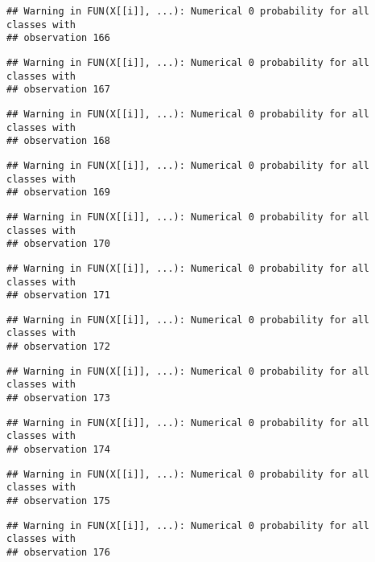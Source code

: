 \documentclass[
]{article}
\begin{document}
\begin{verbatim}
## Warning in FUN(X[[i]], ...): Numerical 0 probability for all classes with
## observation 166
\end{verbatim}

\begin{verbatim}
## Warning in FUN(X[[i]], ...): Numerical 0 probability for all classes with
## observation 167
\end{verbatim}

\begin{verbatim}
## Warning in FUN(X[[i]], ...): Numerical 0 probability for all classes with
## observation 168
\end{verbatim}

\begin{verbatim}
## Warning in FUN(X[[i]], ...): Numerical 0 probability for all classes with
## observation 169
\end{verbatim}

\begin{verbatim}
## Warning in FUN(X[[i]], ...): Numerical 0 probability for all classes with
## observation 170
\end{verbatim}

\begin{verbatim}
## Warning in FUN(X[[i]], ...): Numerical 0 probability for all classes with
## observation 171
\end{verbatim}

\begin{verbatim}
## Warning in FUN(X[[i]], ...): Numerical 0 probability for all classes with
## observation 172
\end{verbatim}

\begin{verbatim}
## Warning in FUN(X[[i]], ...): Numerical 0 probability for all classes with
## observation 173
\end{verbatim}

\begin{verbatim}
## Warning in FUN(X[[i]], ...): Numerical 0 probability for all classes with
## observation 174
\end{verbatim}

\begin{verbatim}
## Warning in FUN(X[[i]], ...): Numerical 0 probability for all classes with
## observation 175
\end{verbatim}

\begin{verbatim}
## Warning in FUN(X[[i]], ...): Numerical 0 probability for all classes with
## observation 176
\end{verbatim}
\end{document}
